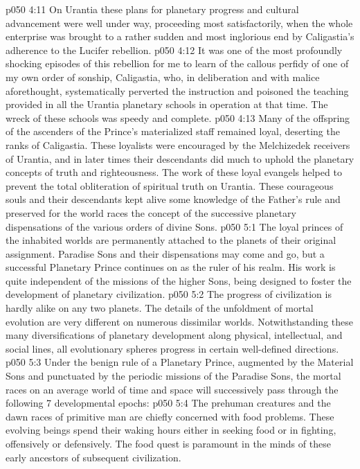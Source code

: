 \vs p050 4:11 \pc On Urantia these plans for planetary progress and cultural advancement were well under way, proceeding most satisfactorily, when the whole enterprise was brought to a rather sudden and most inglorious end by Caligastia’s adherence to the Lucifer rebellion.
\vs p050 4:12 It was one of the most profoundly shocking episodes of this rebellion for me to learn of the callous perfidy of one of my own order of sonship, Caligastia, who, in deliberation and with malice aforethought, systematically perverted the instruction and poisoned the teaching provided in all the Urantia planetary schools in operation at that time. The wreck of these schools was speedy and complete.
\vs p050 4:13 Many of the offspring of the ascenders of the Prince’s materialized staff remained loyal, deserting the ranks of Caligastia. These loyalists were encouraged by the Melchizedek receivers of Urantia, and in later times their descendants did much to uphold the planetary concepts of truth and righteousness. The work of these loyal evangels helped to prevent the total obliteration of spiritual truth on Urantia. These courageous souls and their descendants kept alive some knowledge of the Father’s rule and preserved for the world races the concept of the successive planetary dispensations of the various orders of divine Sons.
\vs p050 5:1 The loyal princes of the inhabited worlds are permanently attached to the planets of their original assignment. Paradise Sons and their dispensations may come and go, but a successful Planetary Prince continues on as the ruler of his realm. His work is quite independent of the missions of the higher Sons, being designed to foster the development of planetary civilization.
\vs p050 5:2 The progress of civilization is hardly alike on any two planets. The details of the unfoldment of mortal evolution are very different on numerous dissimilar worlds. Notwithstanding these many diversifications of planetary development along physical, intellectual, and social lines, all evolutionary spheres progress in certain well\hyp{}defined directions.
\vs p050 5:3 Under the benign rule of a Planetary Prince, augmented by the Material Sons and punctuated by the periodic missions of the Paradise Sons, the mortal races on an average world of time and space will successively pass through the following 7 developmental epochs:
\vs p050 5:4 \bibnobreakspace {} The prehuman creatures and the dawn races of primitive man are chiefly concerned with food problems. These evolving beings spend their waking hours either in seeking food or in fighting, offensively or defensively. The food quest is paramount in the minds of these early ancestors of subsequent civilization.
